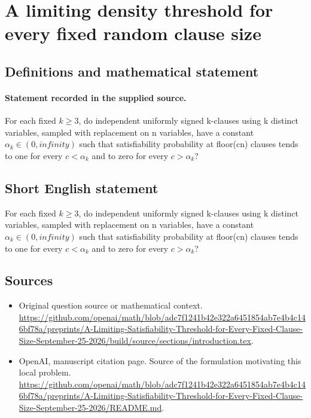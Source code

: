 \documentclass[11pt]{article}
\begin{document}
\section*{A limiting density threshold for every fixed random clause size}\label{statement}
\subsection{Definitions and mathematical statement}
\paragraph{Statement recorded in the supplied source.}
For each fixed $k\geq 3$, do independent uniformly signed k-clauses using k distinct variables, sampled with replacement on n variables, have a constant $\alpha _k\in (0,infinity)$ such that satisfiability probability at floor(cn) clauses tends to one for every $c<\alpha _k$ and to zero for every $c>\alpha _k$?
\subsection{Short English statement}
For each fixed $k\geq 3$, do independent uniformly signed k-clauses using k distinct variables, sampled with replacement on n variables, have a constant $\alpha _k\in (0,infinity)$ such that satisfiability probability at floor(cn) clauses tends to one for every $c<\alpha _k$ and to zero for every $c>\alpha _k$?
\subsection{Sources}
\begin{itemize}
\item[S1] Original question source or mathematical context.
\url{https://github.com/openai/math/blob/adc7f1241b42e322a6451854ab7e4b4c146bf78a/preprints/A-Limiting-Satisfiability-Threshold-for-Every-Fixed-Clause-Size-September-25-2026/build/source/sections/introduction.tex}.
\item[S2] OpenAI, manuscript citation page. Source of the formulation motivating this local problem.
\url{https://github.com/openai/math/blob/adc7f1241b42e322a6451854ab7e4b4c146bf78a/preprints/A-Limiting-Satisfiability-Threshold-for-Every-Fixed-Clause-Size-September-25-2026/README.md}.
\end{itemize}
\end{document}
